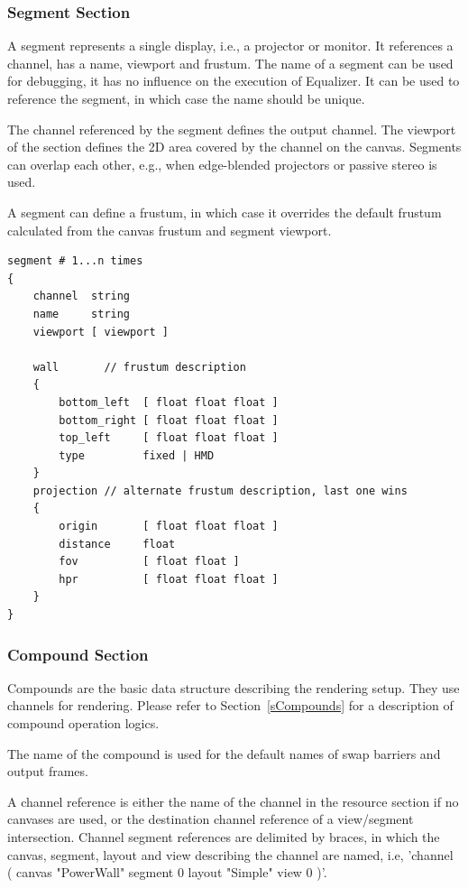 \documentclass[10pt,a4]{scrartcl}
\newcommand{\sref}[1]{Section~\ref{#1}}
\begin{document}
\subsubsection{Segment Section}

A segment represents a single display, i.e., a projector or monitor. It
references a channel, has a name, viewport and frustum. The name of a
segment can be used for debugging, it has no influence on the execution
of Equalizer. It can be used to reference the segment, in which case the
name should be unique.

The channel referenced by the segment defines the output channel. The
viewport of the section defines the 2D area covered by the channel on
the canvas. Segments can overlap each other, e.g., when edge-blended
projectors or passive stereo is used.

A segment can define a frustum, in which case it overrides the default
frustum calculated from the canvas frustum and segment viewport.

{\footnotesize\begin{lstlisting}
segment # 1...n times
{
    channel  string
    name     string
    viewport [ viewport ] 

    wall       // frustum description
    {
        bottom_left  [ float float float ]
        bottom_right [ float float float ]
        top_left     [ float float float ]
        type         fixed | HMD
    }
    projection // alternate frustum description, last one wins
    {
        origin       [ float float float ]
        distance     float
        fov          [ float float ]
        hpr          [ float float float ]
    }
}
\end{lstlisting}}

\subsubsection{Compound Section}

Compounds are the basic data structure describing the rendering
setup. They use channels for rendering. Please refer to
\sref{sCompounds} for a description of compound operation logics.

The name of the compound is used for the default names of swap barriers
and output frames.

A channel reference is either the name of the channel in the resource
section if no canvases are used, or the destination channel reference of
a view/segment intersection. Channel segment references are delimited by
braces, in which the canvas, segment, layout and view describing the
channel are named, i.e, 'channel ( canvas "PowerWall" segment 0 layout
"Simple" view 0 )'.
\end{document}
